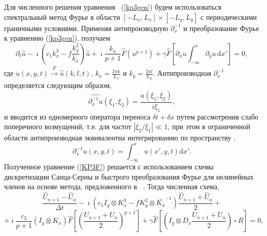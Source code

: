 Для численного решения уравнения ~(\ref {kp3gen}) будем использоваться спектральный метод Фурье в области $\left[-L_x, L_x\right] \times \left[-L_y, L_y\right]$ с периодическими граничными условиями. Применяя антипроизводную $\partial_x^{-1}$ и преобразование Фурье к уравнению (\ref {kp3gen}), получаем
\begin{equation}
	\label{KP3F}
	\partial_t \hat{u} - \imath\left( c_1 k_x^3 - f \frac{k_y^2}{k_x} \right) \hat{u} + \imath \frac{k_x}{p+1} \hat{F} \left(u^{p+1}\right)+\gamma \hat{F} \left[\partial_x u \int_{-\infty}^x \partial_y u \, \mathrm{d}x'\right]=0, 
\end{equation}
где $u (x, y, t) \xrightarrow {\hat{F}} \hat{u} (k, l, t)$, $k_x = \frac{2 \pi k}{L_x}$ и $ k_y = \frac{2 \pi l}{L_y}$. Антипроизводная $\partial_x^{-1}$ определяется следующим образом,
$$
\hat{\partial_x^{-1} u} (\xi_1, \xi_2) = \frac{u(\xi_1, \xi_2)}{i \xi_1},
$$
и вводится из одномерного оператора переноса $\delta t + \delta x$ путем рассмотрения слабо поперечного возмущений, т.е. для частот $| \xi_2 / \xi_1 | \ll 1$, при этом в ограниченной области антипроизводная эквивалентна интегрированию по пространству \cite{mammeri2009unique},
$$
\partial_x^{-1} u(x,y,t) = \int_{-\infty}^x u(x', y, t) \mathrm{d}x'. 
$$
Полученное уравнение (\ref{KP3F}) решается с использованием схемы дискретизации Санца-Серны и быстрого преобразования Фурье для нелинейных членов на основе метода, предложенного в ~\cite {Chebab2016}. Тогда численная схема,
	\begin{equation}
		\label{fkpscheme}
		\frac{\hat{U}_{n+1} - \hat{U}_{n}}{\Delta t} - \imath \left(c_1 I_y \otimes K_x^3 - f K_y^2 \otimes \bar{K_x}^{-1} \right) \frac{\hat{U}_{n+1} + \hat{U}_{n}}{2} +
	\end{equation}
	$$
	+\imath \frac{c_2}{p+1}\left( I_y \otimes K_x \right) \hat{F} \left[ \left( \frac{U_{n+1} + U_{n}}{2}  \right)^{p+1}\right] + \gamma \hat{F} \left[ \left(I_y \otimes D_x \frac{U_{n+1} + U_{n}}{2} \right) \circ R \right] = 0,
	$$
